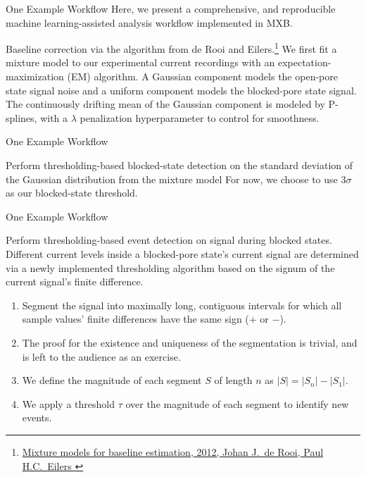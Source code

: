 \documentclass{beamer}
\begin{document}
\begin{frame}{One Example Workflow}
    Here, we present a comprehensive, and reproducible machine learning-assisted analysis workflow implemented in MXB.\pause
    \begin{block}{Baseline correction via the algorithm from de Rooi and Eilers.\footnote{\href{https://doi.org/10.1016/j.chemolab.2011.11.001}{Mixture models for baseline estimation, 2012, Johan J.~de Rooi, Paul H.C.~Eilers }}}
        We first fit a mixture model to our experimental current recordings with an expectation-maximization (EM) algorithm. A Gaussian component models the open-pore state signal noise and a uniform component models the blocked-pore state signal. The continuously drifting mean of the Gaussian component is modeled by P-splines, with a $\lambda$ penalization hyperparameter to control for smoothness.
    \end{block}
\end{frame}

\begin{frame}{One Example Workflow}

    \begin{block}{Perform thresholding-based blocked-state detection on the standard deviation of the Gaussian distribution from the mixture model}
        For now, we choose to use $3\sigma$ as our blocked-state threshold.
    \end{block}

\end{frame}
\begin{frame}{One Example Workflow}
    \begin{block}{Perform thresholding-based event detection on signal during blocked states. }
        Different current levels inside a blocked-pore state's current signal are determined via a newly implemented thresholding algorithm based on the signum of the current signal's finite difference.
        \begin{enumerate}
            \item Segment the signal into maximally long, contiguous intervals for which all sample values' finite differences have the same sign ($+$ or $-$).\pause
            \item The proof for the existence and uniqueness of the segmentation is trivial, and is left to the audience as an exercise.\pause
            \item We define the magnitude of each segment $S$ of length $n$ as $|S| = |S_n| - |S_1|$.\pause
            \item We apply a threshold $\tau$ over the magnitude of each segment to identify new events.
        \end{enumerate}
    \end{block}
    
\end{frame}
\end{document}
